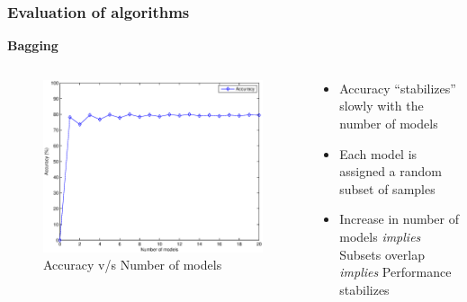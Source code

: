 \documentclass[9pt]{beamer}
\begin{document}
    \begin{frame}
        \frametitle{Evaluation of algorithms}
        \begin{center}
            \textbf{Bagging}
        \end{center}
        \begin{columns}
            \begin{column}{0.5\textwidth}
                \begin{figure}
                    \centering
                    \includegraphics[width=\textwidth]{figures/bagging_n_models.eps}
                    \caption{Accuracy v/s Number of models}
                \end{figure}
            \end{column}
            \begin{column}{0.5\textwidth}
                \begin{itemize}
                    \item{Accuracy ``stabilizes'' slowly with the number of models}
                    \item{Each model is assigned a random subset of samples}
                    \item{Increase in number of models \emph{implies} Subsets overlap \emph{implies} Performance stabilizes}
                \end{itemize}
            \end{column}
        \end{columns}
    \end{frame}
    
\end{document}
